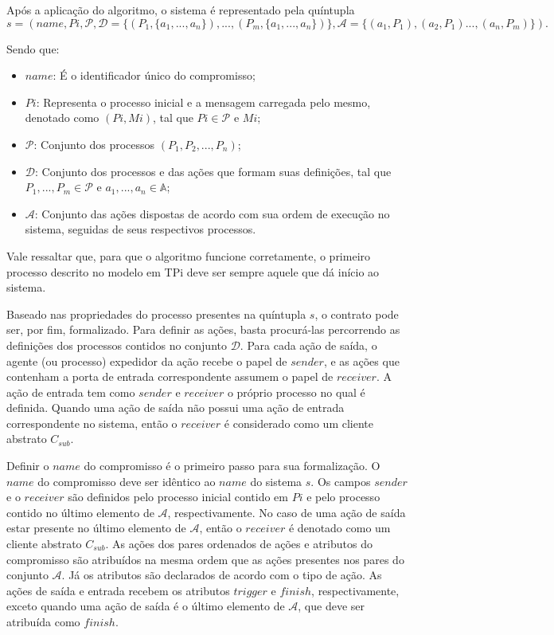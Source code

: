 Após a aplicação do algoritmo, o sistema é representado pela quíntupla $$s = (name, Pi, \mathcal{P}, \mathcal{D} = \{(P_{1}, \{a_{1},...,a_{n}\}), ..., (P_{m}, \{a_{1},...,a_{n}\})\}, \mathcal{A} = \{(a_{1}, P_{1}), (a_{2}, P_{1})..., (a_{n}, P_{m})\}).$$

Sendo que:
\begin{itemize}
	\item $name$: É o identificador único do compromisso;
	\item $Pi$: Representa o processo inicial e a mensagem carregada pelo mesmo, denotado como $(Pi, Mi)$, tal que $Pi \in \mathcal{P}$ e $Mi$;
	\item $\mathcal{P}$: Conjunto dos processos $(P_{1}, P_{2}, ..., P_{n})$;
	\item $\mathcal{D}$: Conjunto dos processos e das ações que formam suas definições, tal que $P_{1}, ..., P_{m} \in \mathcal{P}$ e $a_{1}, ..., a_{n} \in \mathbb{A}$;
	\item $\mathcal{A}$: Conjunto das ações dispostas de acordo com sua ordem de execução no sistema, seguidas de seus respectivos processos.
\end{itemize}

Vale ressaltar que, para que o algoritmo funcione corretamente, o primeiro processo descrito no modelo em TPi deve ser sempre aquele que dá início ao sistema. 

Baseado nas propriedades do processo presentes na quíntupla $s$, o contrato pode ser, por fim, formalizado. Para definir as ações, basta procurá-las percorrendo as definições dos processos contidos no conjunto $\mathcal{D}$. Para cada ação de saída, o agente (ou processo) expedidor da ação recebe o papel de $sender$, e as ações que contenham a porta de entrada correspondente assumem o papel de $receiver$. A ação de entrada tem como $sender$ e $receiver$ o próprio processo no qual é definida. Quando uma ação de saída não possui uma ação de entrada correspondente no sistema, então o $receiver$ é considerado como um cliente abstrato $C_{sub}$.

Definir o $name$ do compromisso é o primeiro passo para sua formalização. O $name$ do compromisso deve ser idêntico ao $name$ do sistema $s$. Os campos $sender$ e o $receiver$ são definidos pelo processo inicial contido em $Pi$ e pelo processo contido no último elemento de $\mathcal{A}$, respectivamente. No caso de uma ação de saída estar presente no último elemento de $\mathcal{A}$, então o $receiver$ é denotado como um cliente abstrato $C_{sub}$. As ações dos pares ordenados de ações e atributos do compromisso são atribuídos na mesma ordem que as ações presentes nos pares do conjunto $\mathcal{A}$. Já os atributos são declarados de acordo com o tipo de ação. As ações de saída e entrada recebem os atributos $trigger$ e $finish$, respectivamente, exceto quando uma ação de saída é o último elemento de $\mathcal{A}$, que deve ser atribuída como $finish$.

